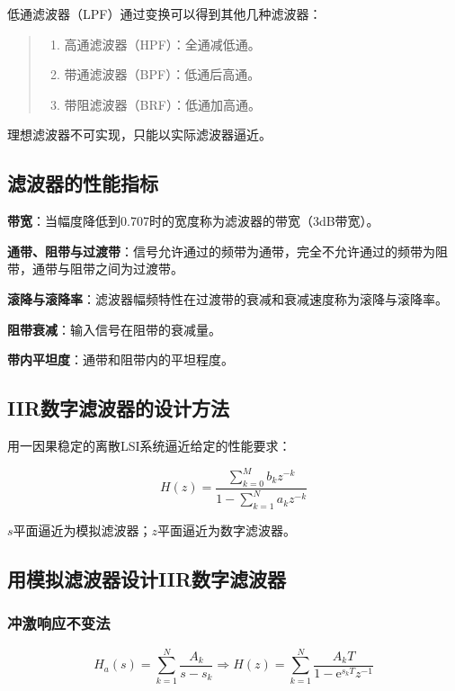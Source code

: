 \documentclass[cn, hazy, blue, normal, 12pt]{elegantnote}
\begin{document}
低通滤波器（LPF）通过变换可以得到其他几种滤波器：

\begin{quote}
\begin{enumerate}
    \item 高通滤波器（HPF）：全通减低通。
    \item 带通滤波器（BPF）：低通后高通。
    \item 带阻滤波器（BRF）：低通加高通。
\end{enumerate}
\end{quote}

理想滤波器不可实现，只能以实际滤波器逼近。

\subsection{滤波器的性能指标}

\textbf{带宽}：当幅度降低到0.707时的宽度称为滤波器的带宽（3dB带宽）。

\textbf{通带、阻带与过渡带}：信号允许通过的频带为通带，完全不允许通过的频带为阻带，通带与阻带之间为过渡带。

\textbf{滚降与滚降率}：滤波器幅频特性在过渡带的衰减和衰减速度称为滚降与滚降率。

\textbf{阻带衰减}：输入信号在阻带的衰减量。

\textbf{带内平坦度}：通带和阻带内的平坦程度。

\subsection{IIR数字滤波器的设计方法}

用一因果稳定的离散LSI系统逼近给定的性能要求：

$$H(z)=\frac{\sum\limits_{k=0}^{M}b_k z^{-k}}{1-\sum\limits_{k=1}^{N}a_k z^{-k}}$$

$s$平面逼近为模拟滤波器；$z$平面逼近为数字滤波器。

\subsection{用模拟滤波器设计IIR数字滤波器}

\subsubsection{冲激响应不变法}

\begin{equation}
    H_a(s)=\sum_{k=1}^{N}\frac{A_k}{s-s_k} \Rightarrow H(z)=\sum_{k=1}^{N}\frac{A_k T}{1-\text{e}^{s_k T}z^{-1}} 
\end{equation}
\end{document}
